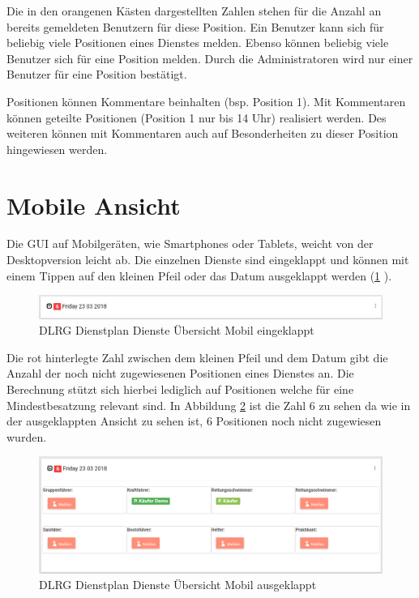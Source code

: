 \noindent Die in den orangenen Kästen dargestellten Zahlen stehen für die Anzahl an bereits gemeldeten Benutzern für diese Position. Ein Benutzer kann sich für beliebig viele Positionen eines Dienstes melden. Ebenso können beliebig viele Benutzer sich für eine Position melden. Durch die Administratoren wird nur einer Benutzer für eine Position bestätigt.

\noindent Positionen können Kommentare beinhalten (bsp. Position 1). Mit Kommentaren können geteilte Positionen (Position 1 nur bis 14 Uhr) realisiert werden. Des weiteren können mit Kommentaren auch auf Besonderheiten zu dieser Position hingewiesen werden.


\section{Mobile Ansicht}
\label{sec:dienste_mobile}
Die GUI auf Mobilgeräten, wie \zB Smartphones oder Tablets, weicht von der Desktopversion leicht ab. Die einzelnen Dienste sind eingeklappt und können mit einem Tippen auf den kleinen Pfeil oder das Datum ausgeklappt werden (\ref{fig:view_service_mobile_close} \textit{}). 


\begin{figure}[h]
 \begin{addmargin}{-0.2\linewidth}
   \centering 
   \includegraphics[width=20cm]{Bilder/view_service_mobile_close.png}
 \end{addmargin} 
 \caption[Dienste Übersicht Mobil]{DLRG Dienstplan Dienste Übersicht Mobil eingeklappt}
 \label{fig:view_service_mobile_close}
\end{figure}


\noindent Die rot hinterlegte Zahl zwischen dem kleinen Pfeil und dem Datum gibt die Anzahl der noch nicht zugewiesenen Positionen eines Dienstes an. Die Berechnung stützt sich hierbei lediglich auf Positionen welche für eine Mindestbesatzung relevant sind. In Abbildung \ref{fig:view_service_mobile} \textit{} ist die Zahl 6 zu sehen da wie in der ausgeklappten Ansicht zu sehen ist, 6 Positionen noch nicht zugewiesen wurden.

\begin{figure}[h]
 \begin{addmargin}{-0.2\linewidth}
   \centering 
   \includegraphics[width=20cm]{Bilder/view_service_mobile.png}
 \end{addmargin} 
 \caption[Dienste Übersicht Mobil Ausgeklappt]{DLRG Dienstplan Dienste Übersicht Mobil ausgeklappt}
 \label{fig:view_service_mobile}
\end{figure}